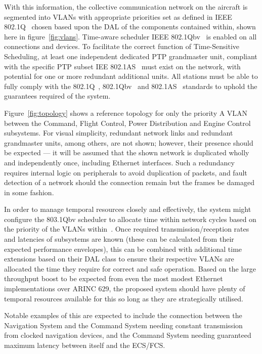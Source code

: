 With this information, the collective communication network on the aircraft is segmented into VLANs with appropriate priorities set as defined in IEEE 802.1Q~\cite{IEEEStandardLocal2022} chosen based upon the DAL of the components contained within, shown here in figure~\ref{fig:vlans}.
Time-aware scheduler IEEE 802.1Qbv~\cite{IEEEStandardLocal2018a}\cite{ISOIECIEEE2018} is enabled on all connections and devices.
To facilitate the correct function of Time-Sensitive Scheduling, at least one independent dedicated PTP grandmaster unit, compliant with the specific PTP subset IEE 802.1AS~\cite{IEEEStandardLocal2020} must exist on the network, with potential for one or more redundant additional units.
All stations must be able to fully comply with the 802.1Q~\cite{IEEEStandardLocal2018a}, 802.1Qbv~\cite{IEEEStandardLocal2016a} and 802.1AS~\cite{IEEEStandardLocal2020} standards to uphold the guarantees required of the system.

Figure~\ref{fig:topology} shows a reference topology for only the priority A VLAN between the Command, Flight Control, Power Distribution and Engine Control subsystems.
For visual simplicity, redundant network links and redundant grandmaster units, among others, are not shown; however, their presence should be expected --- it will be assumed that the shown network is duplicated wholly and independently once, including Ethernet interfaces.
Such a redundancy requires internal logic on peripherals to avoid duplication of packets, and fault detection of a network should the connection remain but the frames be damaged in some fashion.

In order to manage temporal resources closely and effectively, the system might configure the 803.1Qbv scheduler to allocate time within network cycles based on the priority of the VLANs within~\cite{IEEEStandardLocal2016a}.
Once required transmission/reception rates and latencies of subsystems are known (these can be calculated from their expected performance envelopes), this can be combined with additional time extensions based on their DAL class to ensure their respective VLANs are allocated the time they require for correct and safe operation.
Based on the large throughput boost to be expected from even the most modest Ethernet implementations over ARINC 629, the proposed system should have plenty of temporal resources available for this so long as they are strategically utilised.

Notable examples of this are expected to include the connection between the Navigation System and the Command System needing constant transmission from clocked navigation devices, and the Command System needing guaranteed maximum latency between itself and the ECS/FCS.


